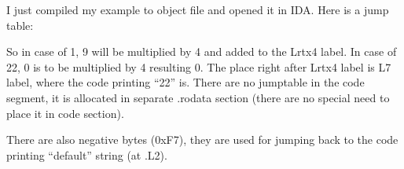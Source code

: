I just compiled my example to object file and opened it in IDA. Here is a jump table:



So in case of 1, 9 will be multiplied by 4 and added to the Lrtx4 label.
In case of 22, 0 is to be multiplied by 4 resulting 0. 
The place right after Lrtx4 label is L7 label, where the code printing ``22'' is.
There are no jumptable in the code segment, it is allocated in separate .rodata section 
(there are no special need to place it in code section).

There are also negative bytes (0xF7), they are used for jumping back to the code printing ``default'' string 
(at .L2).
\fi
